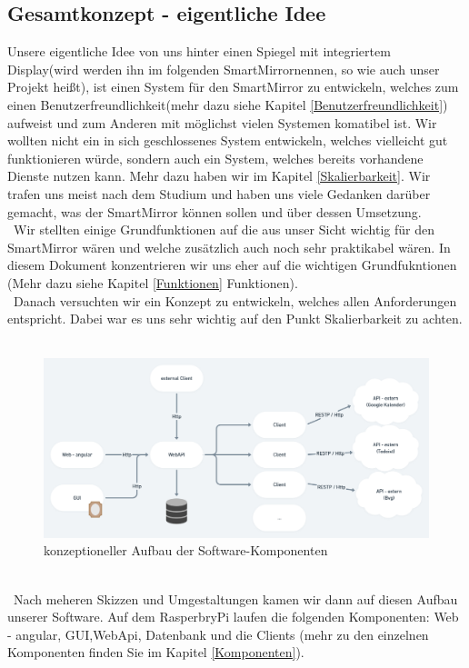 \subsection{Gesamtkonzept - eigentliche Idee} 
Unsere eigentliche Idee von uns hinter einen \dq Spiegel mit integriertem Display\dq (wird werden ihn im folgenden \dq SmartMirror\dq nennen, so wie auch unser Projekt heißt), ist einen System für den SmartMirror zu entwickeln, welches zum einen Benutzerfreundlichkeit(mehr dazu siehe Kapitel \ref{Benutzerfreundlichkeit}) aufweist und zum Anderen mit möglichst vielen Systemen komatibel ist. Wir wollten nicht ein in sich geschlossenes System entwickeln, welches vielleicht gut funktionieren würde, sondern auch ein System, welches bereits vorhandene Dienste nutzen kann. Mehr dazu haben wir im Kapitel \ref{Skalierbarkeit}.
Wir trafen uns meist nach dem Studium und haben uns viele Gedanken darüber gemacht, was der SmartMirror können sollen und über dessen Umsetzung. \\\
Wir stellten einige Grundfunktionen auf die aus unser Sicht wichtig für den SmartMirror wären und welche zusätzlich auch noch sehr praktikabel wären. In diesem Dokument konzentrieren wir uns eher auf die wichtigen Grundfukntionen (Mehr dazu siehe Kapitel \ref{Funktionen} Funktionen).\\\
Danach versuchten wir ein Konzept zu entwickeln, welches allen Anforderungen entspricht. Dabei war es uns sehr wichtig auf den Punkt Skalierbarkeit zu achten.\\\
\begin{figure}[h]
\centering
\includegraphics[width=150mm]{pictures/Scalability.png}
\caption{konzeptioneller Aufbau der Software-Komponenten}
\end{figure}\\\
Nach meheren Skizzen und Umgestaltungen kamen wir dann auf diesen Aufbau unserer Software. Auf dem RasperbryPi laufen die folgenden Komponenten: Web - angular, GUI,WebApi, Datenbank und die Clients (mehr zu den einzelnen Komponenten finden Sie im Kapitel \ref{Komponenten}). \\\
